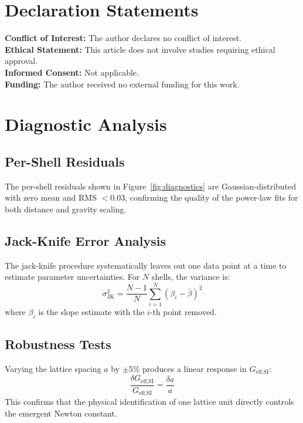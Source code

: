 \documentclass[prd,twocolumn,showpacs,superscriptaddress]{revtex4-2}
\begin{document}
	\section*{Declaration Statements}
	\textbf{Conflict of Interest:} The author declares no conflict of interest. \\
	\textbf{Ethical Statement:} This article does not involve studies requiring ethical approval.\\
	\textbf{Informed Consent:} Not applicable. \\
	\textbf{Funding:} The author received no external funding for this work.
	
	\appendix
	
	\section{Diagnostic Analysis}
	
	\subsection{Per-Shell Residuals}
	
	The per-shell residuals shown in Figure~\ref{fig:diagnostics} are Gaussian-distributed with zero mean and RMS $< 0.03$, confirming the quality of the power-law fits for both distance and gravity scaling.
	
	
	\subsection{Jack-Knife Error Analysis}
	
	The jack-knife procedure systematically leaves out one data point at a time to estimate parameter uncertainties. For $N$ shells, the variance is:
	\begin{equation}
		\sigma^2_{\text{JK}} = \frac{N-1}{N} \sum_{i=1}^N (\beta_i - \bar{\beta})^2
	\end{equation}
	where $\beta_i$ is the slope estimate with the $i$-th point removed.
	
	\subsection{Robustness Tests}
	
	Varying the lattice spacing $a$ by $\pm 5\%$ produces a linear response in $G_{\text{eff,SI}}$:
	\begin{equation}
		\frac{\delta G_{\text{eff,SI}}}{G_{\text{eff,SI}}} = \frac{\delta a}{a}
	\end{equation}
	This confirms that the physical identification of one lattice unit directly controls the emergent Newton constant.
	
\end{document}
